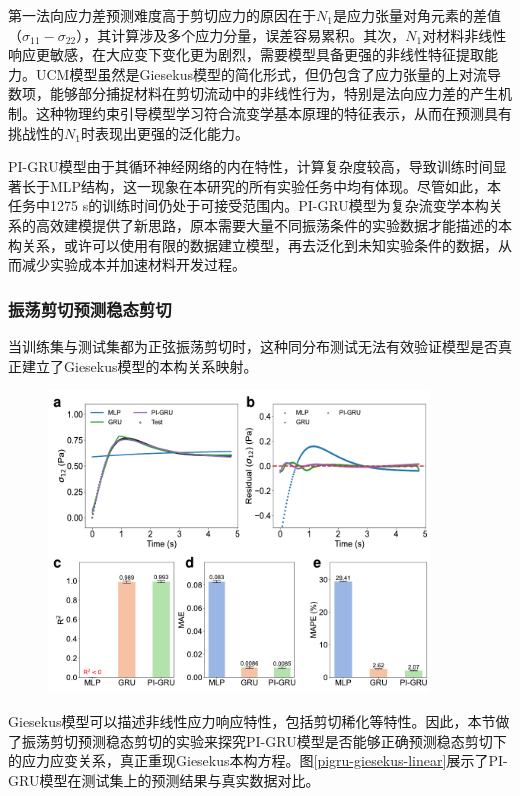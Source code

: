 第一法向应力差预测难度高于剪切应力的原因在于$N_1$是应力张量对角元素的差值（$\sigma_{11}-\sigma_{22}$），其计算涉及多个应力分量，误差容易累积。其次，$N_1$对材料非线性响应更敏感，在大应变下变化更为剧烈，需要模型具备更强的非线性特征提取能力。UCM模型虽然是Giesekus模型的简化形式，但仍包含了应力张量的上对流导数项，能够部分捕捉材料在剪切流动中的非线性行为，特别是法向应力差的产生机制。这种物理约束引导模型学习符合流变学基本原理的特征表示，从而在预测具有挑战性的$N_1$时表现出更强的泛化能力。

PI-GRU模型由于其循环神经网络的内在特性，计算复杂度较高，导致训练时间显著长于MLP结构，这一现象在本研究的所有实验任务中均有体现。尽管如此，本任务中1275 s的训练时间仍处于可接受范围内。PI-GRU模型为复杂流变学本构关系的高效建模提供了新思路，原本需要大量不同振荡条件的实验数据才能描述的本构关系，或许可以使用有限的数据建立模型，再去泛化到未知实验条件的数据，从而减少实验成本并加速材料开发过程。

\subsubsection{振荡剪切预测稳态剪切}
当训练集与测试集都为正弦振荡剪切时，这种同分布测试无法有效验证模型是否真正建立了Giesekus模型的本构关系映射。
\begin{figure}
  \centering
  \includegraphics[width=0.9\textwidth]{Fig/pigru-giesekus-linear.pdf}
\end{figure}
Giesekus模型可以描述非线性应力响应特性，包括剪切稀化等特性。因此，本节做了振荡剪切预测稳态剪切的实验来探究PI-GRU模型是否能够正确预测稳态剪切下的应力应变关系，真正重现Giesekus本构方程。图\ref{pigru-giesekus-linear}展示了PI-GRU模型在测试集上的预测结果与真实数据对比。


